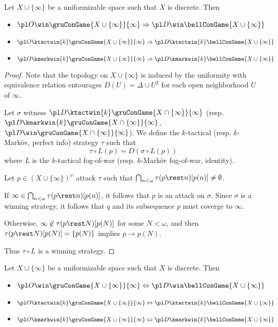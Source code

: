 \begin{thm}
  Let $X\cup\{\infty\}$ be a uniformizable space such that $X$ is discrete. Then
  \begin{itemize}
    \item
      $\pl O\win \gruConGame{X\cup\{\infty\}}{\infty} \Rightarrow \pl D \win \bellConGame{X\cup\{\infty\}}$
    \item
      $\pl O\ktactwin{k} \gruConGame{X\cup\{\infty\}}{\infty} \Rightarrow \pl D \ktactwin{k} \bellConGame{X\cup\{\infty\}}$
    \item
      $\pl O\kmarkwin{k} \gruConGame{X\cup\{\infty\}}{\infty} \Rightarrow \pl D \kmarkwin{k} \bellConGame{X\cup\{\infty\}}$
  \end{itemize}
\end{thm}

\begin{proof}
  Note that the topology on $X\cup\{\infty\}$ is induced by the uniformity with equivalence relation entourages $D(U)=\Delta\cup U^2$ for each open neighborhood $U$ of $\infty$.

  Let $\sigma$ witness $\pl D \ktactwin{k}\gruConGame{X\cap\{\infty\}}{\infty}$ (resp. $\pl D \kmarkwin{k}\gruConGame{X\cap\{\infty\}}{\infty}$, $\pl D\win\gruConGame{X\cap\{\infty\}}{\infty}$). We define the $k$-tactical (resp. $k$-Mark\"ov, perfect info) strategy $\tau$ such that
    \[
      \tau\circ L(p)
        =
      D(\sigma\circ L(p))
    \]
  where $L$ is the $k$-tactical fog-of-war (resp. $k$-Mark\"ov fog-of-war, identity).

  Let $p\in (X\cup\{\infty\})^\omega$ attack $\tau$ such that $\bigcap_{n<\omega}\tau(p\rest n)[p(n)]\not=\emptyset$.

  If $\infty\in\bigcap_{n<\omega}\tau(p\rest n)[p(n)]$, it follows that $p$ is an attack on $\sigma$. Since $\sigma$ is a winning strategy, it follows that $q$ and its subsequence $p$ must coverge to $\infty$.

  Otherwise, $\infty\not\in\tau(p\rest N)[p(N)]$ for some $N<\omega$, and then $\tau(p\rest N)[p(N)]=\{p(N)\}$ implies $p\to p(N)$.

  Thus $\tau\circ L$ is a winning strategy.
\end{proof}

\begin{cor}
  Let $X\cup\{\infty\}$ be a uniformizable space such that $X$ is discrete. Then
  \begin{itemize}
    \item
      $\pl O\win \gruConGame{X\cup\{\infty\}}{\infty} \Leftrightarrow \pl D \win \bellConGame{X\cup\{\infty\}}$
    \item
      $\pl O\ktactwin{k} \gruConGame{X\cup\{\infty\}}{\infty} \Leftrightarrow \pl D \ktactwin{k} \bellConGame{X\cup\{\infty\}}$
    \item
      $\pl O\kmarkwin{k} \gruConGame{X\cup\{\infty\}}{\infty} \Leftrightarrow \pl D \kmarkwin{k} \bellConGame{X\cup\{\infty\}}$
  \end{itemize}
\end{cor}


